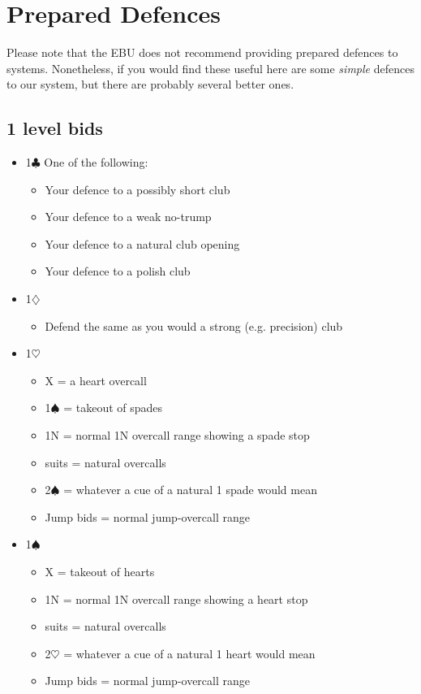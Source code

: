 \section{Prepared Defences}
\label{appx:defences}

Please note that the EBU does not recommend providing prepared defences to
systems.  Nonetheless, if you would find these useful here are some {\em simple}
defences to our system, but there are probably several better ones.

\subsection{1 level bids}

\begin{itemize}
\item 1$\clubsuit$
	One of the following:
	\begin{itemize}
	\item Your defence to a possibly short club
	\item Your defence to a weak no-trump
	\item Your defence to a natural club opening 
	\item Your defence to a polish club
	\end{itemize}
\item 1$\diamondsuit$
	\begin{itemize}
	\item Defend the same as you would a strong (e.g. precision) club
	\end{itemize}
\item 1$\heartsuit$
	\begin{itemize}
	\item X = a heart overcall
	\item 1$\spadesuit$ = takeout of spades
	\item 1N = normal 1N overcall range showing a spade stop
	\item suits = natural overcalls
	\item 2$\spadesuit$ = whatever a cue of a natural 1 spade would mean 
	\item Jump bids = normal jump-overcall range
	\end{itemize}
\item 1$\spadesuit$
	\begin{itemize}
	\item X = takeout of hearts
	\item 1N = normal 1N overcall range showing a heart stop
	\item suits = natural overcalls
	\item 2$\heartsuit$ = whatever a cue of a natural 1 heart would mean 
	\item Jump bids = normal jump-overcall range
	\end{itemize}


\end{itemize}
